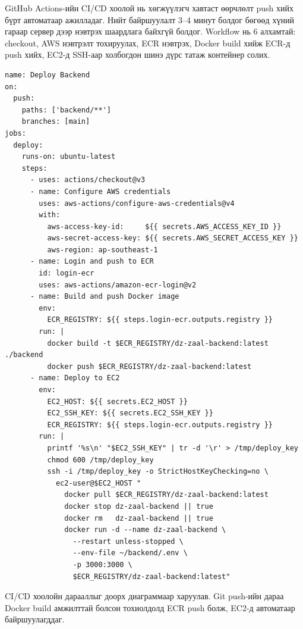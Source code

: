 GitHub Actions-ийн CI/CD хоолой нь хөгжүүлэгч  хавтаст өөрчлөлт push хийх бүрт автоматаар ажилладаг. Нийт байршуулалт 3--4 минут болдог бөгөөд хүний гараар сервер дээр нэвтрэх шаардлага байхгүй болдог. Workflow нь 6 алхамтай: checkout, AWS нэвтрэлт тохируулах, ECR нэвтрэх, Docker build хийж ECR-д push хийх, EC2-д SSH-аар холбогдон шинэ дүрс татаж контейнер солих.

\begin{lstlisting}[language={}, caption={GitHub Actions --- автомат байршуулалтын workflow (.github/workflows/deploy.yml)}]
name: Deploy Backend
on:
  push:
    paths: ['backend/**']
    branches: [main]
jobs:
  deploy:
    runs-on: ubuntu-latest
    steps:
      - uses: actions/checkout@v3
      - name: Configure AWS credentials
        uses: aws-actions/configure-aws-credentials@v4
        with:
          aws-access-key-id:     ${{ secrets.AWS_ACCESS_KEY_ID }}
          aws-secret-access-key: ${{ secrets.AWS_SECRET_ACCESS_KEY }}
          aws-region: ap-southeast-1
      - name: Login and push to ECR
        id: login-ecr
        uses: aws-actions/amazon-ecr-login@v2
      - name: Build and push Docker image
        env:
          ECR_REGISTRY: ${{ steps.login-ecr.outputs.registry }}
        run: |
          docker build -t $ECR_REGISTRY/dz-zaal-backend:latest ./backend
          docker push $ECR_REGISTRY/dz-zaal-backend:latest
      - name: Deploy to EC2
        env:
          EC2_HOST: ${{ secrets.EC2_HOST }}
          EC2_SSH_KEY: ${{ secrets.EC2_SSH_KEY }}
          ECR_REGISTRY: ${{ steps.login-ecr.outputs.registry }}
        run: |
          printf '%s\n' "$EC2_SSH_KEY" | tr -d '\r' > /tmp/deploy_key
          chmod 600 /tmp/deploy_key
          ssh -i /tmp/deploy_key -o StrictHostKeyChecking=no \
            ec2-user@$EC2_HOST "
              docker pull $ECR_REGISTRY/dz-zaal-backend:latest
              docker stop dz-zaal-backend || true
              docker rm   dz-zaal-backend || true
              docker run -d --name dz-zaal-backend \
                --restart unless-stopped \
                --env-file ~/backend/.env \
                -p 3000:3000 \
                $ECR_REGISTRY/dz-zaal-backend:latest"
\end{lstlisting}

CI/CD хоолойн дарааллыг доорх диаграммаар харуулав. Git push-ийн дараа Docker build амжилттай болсон тохиолдолд ECR push болж, EC2-д автоматаар байршуулагддаг.

